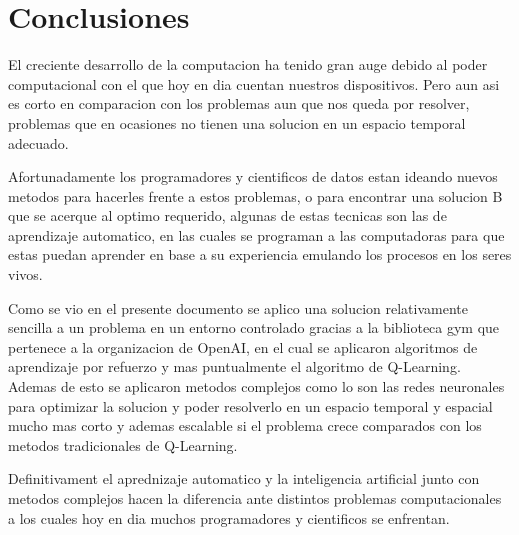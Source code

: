 \section{Conclusiones}

El creciente desarrollo de la computacion ha tenido gran auge debido al poder computacional con el que hoy en dia cuentan nuestros dispositivos. Pero aun asi es corto en comparacion con los problemas aun que nos queda por resolver, problemas que en ocasiones no tienen una solucion en un espacio temporal adecuado.

Afortunadamente los programadores y cientificos de datos estan ideando nuevos metodos para hacerles frente a estos problemas, o para encontrar una solucion B que se acerque al optimo requerido, algunas de estas tecnicas son las de aprendizaje automatico, en las cuales se programan a las computadoras para que estas puedan aprender en base a su experiencia emulando los procesos en los seres vivos.

Como se vio en el presente documento se aplico una solucion relativamente sencilla a un problema en un entorno controlado gracias a la biblioteca gym que pertenece a la organizacion de OpenAI, en el cual se aplicaron algoritmos de aprendizaje por refuerzo y mas puntualmente el algoritmo de Q-Learning. Ademas de esto se aplicaron metodos complejos como lo son las redes neuronales para optimizar la solucion y poder resolverlo en un espacio temporal y espacial mucho mas corto y ademas escalable si el problema crece comparados con los metodos tradicionales de Q-Learning.

Definitivament el aprednizaje automatico y la inteligencia artificial junto con metodos complejos hacen la diferencia ante distintos problemas computacionales a los cuales hoy en dia muchos programadores y cientificos se enfrentan.